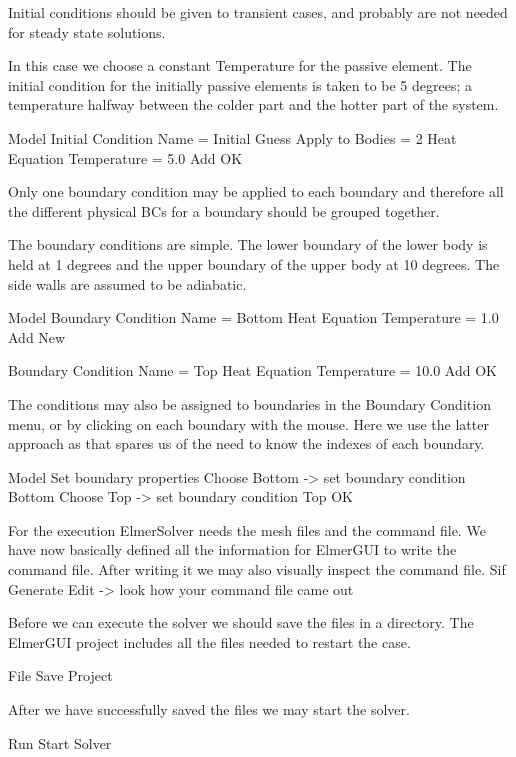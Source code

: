 Initial conditions should be given to transient cases, and probably are not needed for steady state solutions.

In this case we choose a constant Temperature for the passive element.  The initial condition for the initially passive elements is taken to be 5 degrees; a temperature halfway between the colder part and the hotter part of the system.
 
\ttbegin
Model
  Initial Condition
    Name = Initial Guess
    Apply to Bodies = 2
    Heat Equation
      Temperature = 5.0
    Add 
    OK
\ttend

Only one boundary condition may be applied to each boundary and therefore all the different physical BCs for a boundary should be grouped together. 

The boundary conditions are simple. The lower boundary of the lower body is held at 1 degrees and the upper boundary of the upper body at 10 degrees.  The side walls are assumed to be adiabatic.

\ttbegin
Model
  Boundary Condition
    Name = Bottom
    Heat Equation
      Temperature = 1.0
    Add
    New

  Boundary Condition
    Name = Top
    Heat Equation
      Temperature = 10.0
    Add
   OK 
\ttend   

The conditions may also be assigned to boundaries in the Boundary Condition menu, or by clicking on each boundary with the mouse. Here we use the latter approach as that spares us of the need to know the indexes of each boundary.

\ttbegin
Model
  Set boundary properties
    Choose Bottom -> set boundary condition Bottom
    Choose Top -> set boundary condition Top
   OK 
\ttend

For the execution ElmerSolver needs the mesh files and the command file.  We have now basically defined all the information for ElmerGUI to write the command file. After writing it we may also visually inspect the command file.
\ttbegin
Sif 
  Generate
  Edit -> look how your command file came out  
\ttend

Before we can execute the solver we should save the files in a directory.  The ElmerGUI project includes all the files needed to restart the case.

\ttbegin
File 
  Save Project
\ttend

After we have successfully saved the files we may start the solver.

\ttbegin
Run
  Start Solver
\ttend

